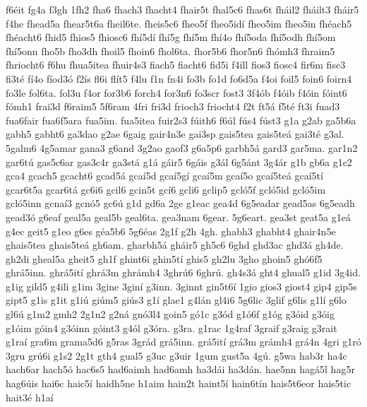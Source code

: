 {f6^^e9it
fg4a
f3gh
1fh2
fha6
fhach3
fhacht4
fhair5t
fhal5c6
fhas6t
fh^^e1il2
fh^^e1ilt3
fh^^e1ir5
f4he
fhead5a
fhear5t6a
fheil6te.
fheis5c6
fheo5f
fheo5id^^ed
fheo5im
fheo5in
fh^^e9ach5
fh^^e9acht6
fhid5
fhios5
fhiosc6
fh^^ed5d^^ed
fh^^ed5g
fh^^ed5m
fh^^ed4o
fh^^ed5oda
fh^^ed5odh
fh^^ed5om
fh^^ed5onn
fho5b
fho3dh
fhoil5
fhoin6
fhol6ta.
fhor5b6
fhor5n6
fh^^f3mh3
fhraim5
fhriocht6
f6hu
fhua5itea
fhuir4s3
fiach5
fiacht6
fid5i
f4ill
fios3
fiosc4
fir6m
fisc3
fi3t^^e9
f^^ed4o
f^^edod3^^f3
f2^^eds
fl6i
fl^^edt5
f4lu
f1n
fn4i
fo3b
fo1d
fo6d5a
f4oi
foil5
foin6
foirn4
fo3le
fol6ta.
fol3u
f4or
for3b6
forch4
for3n6
fo3scr
fost3
3f4^^f3b
f4^^f3ib
f4^^f3in
f^^f3int6
f^^f3mh1
frai3d
f6raim5
5f6ram
4fri
fri3d
frioch3
friocht4
f2t
ft5^^e1
f5t^^e9
ft3i
fuad3
fua6fair
fua6f5ara
fua5im.
fua5itea
fuir2s3
f^^faith6
f6^^fal
f^^fas4
f^^fast3
g1a
g2ab
ga5b6a
gabh5
gabht6
ga3dao
g2ae
6gaig
gair4n3e
gai3sp
gais5tea
gais5te^^e1
gai3t^^e9
g3al.
5galm6
4g5amar
gana3
g6and
3g2ao
gaof3
g6a5p6
garbh5^^e1
gard3
gar5ma.
gar1n2
gar6t^^fa
gas5c6ar
gas3c4r
ga3st^^e1
g1^^e1
g^^e1ir5
6g^^e1is
g3^^e1l
6g5^^e1nt
3g4^^e1r
g1b
gb6a
g1c2
gca4
gcach5
gcacht6
gcad5^^e1
gca^^ed5d
gca^^ed5g^^ed
gca^^ed5m
gca^^ed5o
gca^^ed5te^^e1
gca^^ed5t^^ed
gcar6t5a
gcar6t^^e1
gc6i6
gcil6
gcin5t
gc^^ed6
gcli6
gclip5
gcl^^f35f
gcl^^f35id
gcl^^f35im
gcl^^f35inn
gcna^^ed3
gcn^^f35
gc6^^fa
g1d
gd6a
2ge
g1eac
gea4d
6g5eadar
gead5as
6g5eadh
gead3^^f3
g6eaf
geal5a
geal5b
geal6ta.
gea3nam
6gear.
5g6eart.
gea3st
geat5a
g1e^^e1
g4ec
geit5
g1eo
g6es
g^^e9a5b6
5g6^^e9as
2g1f
g2h
4gh.
ghabh3
ghabht4
ghair4n5e
ghais5tea
ghais5te^^e1
gh6am.
gharbh5^^e1
gh^^e1ir5
gh5c6
6ghd
ghd3ac
ghd3^^e1
gh4de.
gh2di
gheal5a
gheit5
gh1f
ghint6i
ghin5t^^ed
ghis5
gh2lu
3gho
ghoin5
gh^^f36f5
ghr^^e15inn.
ghr^^e15it^^ed
ghr^^e13m
ghr^^e1mh4
3ghr^^fa6
6ghr^^fa.
gh4s3^^e1
ght4
ghual5
g1id
3g4id.
g1ig
gild5
g4ili
g1im
3gine
3gin^^ed
g3inn.
3ginnt
gin5t6^^ed
1gio
gios3
giost4
gip4
gip5s
gipt5
g1is
g1it
g1i^^fa
gi^^fam5
gi^^fas3
g1^^ed
glae1
g4l^^e1n
gl4i6
5g6lic
3glif
g6lis
g1l^^ed
g6lo
gl6^^fa
g1m2
gmh2
2g1n2
g2n^^e1
gn^^f33l4
goin5
g^^f31c
g3^^f3d
g1^^f36f
g1^^f3g
g3^^f3id
g3^^f3ig
g1^^f3im
g^^f3in4
g3^^f3inn
g^^f3int3
g4^^f3l
g3^^f3ra.
g3ra.
g1rac
1g4raf
3graif
g3raig
g3rait
g1ra^^ed
gra6m
grama5d6
g5ras
3gr^^e1d
gr^^e15inn.
gr^^e15it^^ed
gr^^e13m
gr^^e1mh4
gr^^e14n
4gri
g1r^^f3
3gru
gr^^fa6i
g1s2
2g1t
gth4
gual5
g3uc
g3uir
1gum
gust5a
4g^^fa.
g5wa
hab3r
ha4c
hach6ar
hach5^^f3
hac6s5
had6aimh
had6amh
ha3d^^e1i
ha3d^^e1n.
hae5nn
hag^^e15l
hag5r
hag6^^fais
hai6c
haic5^^ed
haidh5ne
h1aim
hain2t
haint5^^ed
hain6t^^edn
hais5t6eor
hais5tic
hait3^^e9
h1a^^ed
}

